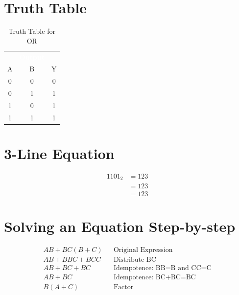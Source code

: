 \section{Truth Table}
\begin{table}[H]
	\sffamily
	\newcommand{\head}[1]{\textcolor{white}{\textbf{#1}}}		
	\begin{center}
		\begin{tabular}{ccc} 
			\rowcolor{black!75}
			\multicolumn{2}{c}{\head{Inputs}} & \head{Output} \\
			A & B & Y \\
			\hline
			0 & 0 & 0 \\
			0 & 1 & 1 \\
			1 & 0 & 1 \\
			1 & 1 & 1 
		\end{tabular}
	\end{center}
	\caption{Truth Table for OR}
	\label{03:tab:truth_table_for_or}
\end{table}


\section{3-Line Equation}
\begin{align}
	\label{03:eq:identity_example}
	1101_2 &= 123 \\
	\nonumber
	&= 123 \\
	\nonumber
	&= 123
\end{align}


\section{Solving an Equation Step-by-step}
\begin{align}
	\label{04:soln:solving_equation_one}
	AB+BC(B+C) && \text{Original Expression} \\
	\nonumber
	AB+BBC+BCC && \text{Distribute BC} \\
	\nonumber
	AB+BC+BC && \text{Idempotence: BB=B and CC=C} \\
	\nonumber
	AB+BC && \text{Idempotence: BC+BC=BC} \\
	\nonumber
	B(A+C) && \text{Factor} \\
\end{align}

